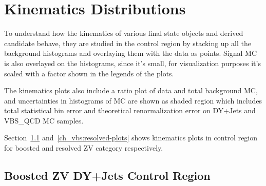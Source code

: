 \clearpage
\section{Kinematics Distributions}

To understand how the kinematics of various final state objects and
derived candidate behave, they are studied in the control
region by stacking up all the background histograms and
overlaying them with the data as points.
Signal \gls{MC} is also overlayed on the histograms, since it's small,
for visualization purposes it's scaled with a factor shown in
the legends of the plots.

The kinematics plots also include a ratio plot of data and total background
\gls{MC}, and uncertainties in histograms of \gls{MC} are shown as shaded region
which includes total statistical bin error and
theoretical renormalization error on DY+Jets and VBS\_QCD \gls{MC} samples.

Section~\ref{ch_vbs:boosted-plots} and~\ref{ch_vbs:resolved-plots}
shows kinematics plots in control region for boosted and
resolved ZV category respectively.

\subsection{
  Boosted ZV DY+Jets Control Region
}\label{ch_vbs:boosted-plots}

